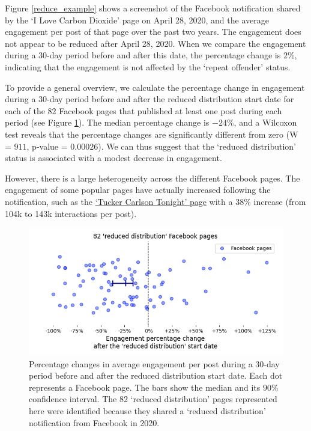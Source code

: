 \documentclass[review]{elsarticle}
\begin{document}
{Figure \ref{reduce_example} shows a screenshot of the Facebook notification shared by the ‘I Love Carbon Dioxide’ page on April 28, 2020, and the average engagement per post of that page over the past two years. 
The engagement does not appear to be reduced after April 28, 2020. 
When we compare the engagement during a 30-day period before and after this date, the percentage change is $2\%$, indicating that the engagement is not affected by the `repeat offender' status.

To provide a general overview, we calculate the percentage change in engagement during a 30-day period before and after the reduced distribution start date for each of the 82 Facebook pages that published at least one post during each period (see Figure \ref{reduce_percentage_change}).
The median percentage change is $-24\%$, and a Wilcoxon test reveals that the percentage changes are significantly different from zero (W = $911$, p-value = $0.00026$).
We can thus suggest that the `reduced distribution' status is associated with a modest decrease in engagement.

However, there is a large heterogeneity across the different Facebook pages. The engagement of some popular pages have actually increased following the notification, such as the \href{https://www.facebook.com/TuckerCarlsonTonight/}{`Tucker Carlson Tonight' page} with a $38\%$ increase (from 104k to 143k interactions per post).

\begin{figure}[!h]
\centering
\includegraphics[scale=0.5]{./../figure/reduce_percentage_change.png}
\caption{
Percentage changes in average engagement per post during a 30-day period before and after the reduced distribution start date. 
Each dot represents a Facebook page. 
The bars show the median and its $90\%$ confidence interval.
The 82 `reduced distribution' pages represented here were identified because they shared a `reduced distribution' notification from Facebook in 2020.
}
\label{reduce_percentage_change}
\end{figure}
 
}
\end{document}
